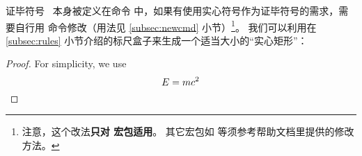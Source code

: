 证毕符号 \qedsymbol\ 本身被定义在命令  中，如果有使用实心符号作为证毕符号的需求，需要自行用 
命令修改（用法见 \ref{subsec:newcmd} 小节）\footnote{注意，这个改法\textbf{只对  宏包适用}。
其它宏包如  等须参考帮助文档里提供的修改方法。}。
我们可以利用在 \ref{subsec:rules} 小节介绍的标尺盒子来生成一个适当大小的“实心矩形”：
\begin{example}
\renewcommand{\qedsymbol}%
  {\rule{1ex}{1.5ex}}
\begin{proof}
For simplicity, we use
\[
E=mc^2 \qedhere
\]
\end{proof}
\end{example}

\endinput
